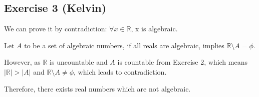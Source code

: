 \subsection*{Exercise 3 (Kelvin)}
We can prove it by contradiction: $\forall{x \in \mathbb{R}}$, x is algebraic.

Let $A$ to be a set of algebraic numbers, if all reals are algebraic, implies $\mathbb{R} \setminus A = \phi$.

However, as $\mathbb{R}$ is uncountable and $A$ is countable from Exercise 2, which means $|\mathbb{R}| > |A|$ and $\mathbb{R} \setminus A \neq \phi$, which leads to contradiction.

Therefore, there exists real numbers which are not algebraic.
